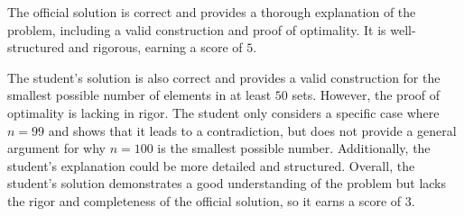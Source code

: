 The official solution is correct and provides a thorough explanation of the problem, including a valid construction and proof of optimality. It is well-structured and rigorous, earning a score of $\boxed{5}$.

The student's solution is also correct and provides a valid construction for the smallest possible number of elements in at least $50$ sets. However, the proof of optimality is lacking in rigor. The student only considers a specific case where $n=99$ and shows that it leads to a contradiction, but does not provide a general argument for why $n=100$ is the smallest possible number. Additionally, the student's explanation could be more detailed and structured. Overall, the student's solution demonstrates a good understanding of the problem but lacks the rigor and completeness of the official solution, so it earns a score of $\boxed{3}$.

